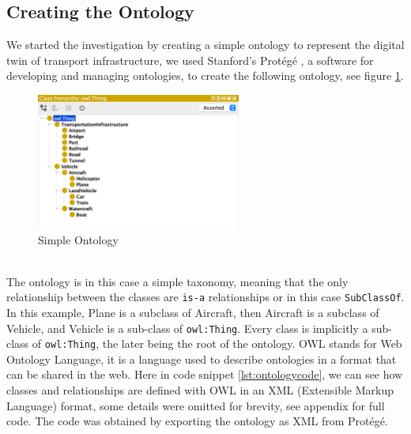 \documentclass[a4paper,11pt,oneside]{article}
\begin{document}
  \subsection{Creating the Ontology}
  
  We started the investigation by creating a simple ontology to represent the digital twin of transport infrastructure, we used Stanford's Protégé \cite{protege}, a software for developing and managing ontologies, to create the following ontology, see figure \ref{fig:ontology}.
  \begin{figure}[h]
    \centering
  	\includegraphics[width=0.6\textwidth]{figures/initial_ontology}
  	\caption{Simple Ontology}
  	\label{fig:ontology}
  \end{figure}
\\
  The ontology is in this case a simple taxonomy, meaning that the only relationship between the classes are \texttt{is-a} relationships or in this case \texttt{SubClassOf}. In this example, Plane is a subclass of Aircraft, then Aircraft is a subclass of Vehicle, and Vehicle is a sub-class of \texttt{owl:Thing}. Every class is implicitly a sub-class of \texttt{owl:Thing}, the later being the root of the ontology. OWL \cite{Bechhofer2009} stands for Web Ontology Language, it is a language used to describe ontologies in a format that can be shared in the web. Here in code snippet \ref{lst:ontologycode}, we can see how classes and relationships are defined with OWL in an XML (Extensible Markup Language) format, some details were omitted for brevity, see appendix for full code. The code was obtained by exporting the ontology as XML from Protégé.
  
\end{document}
